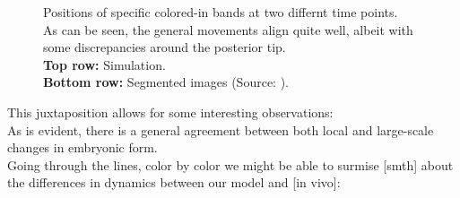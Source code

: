 \begin{figure}[H]
    \centering
\end{figure}
\begin{figure}[H]
    \centering
    \caption{Positions of specific colored-in bands at two differnt time points.\\ 
    As can be seen, the general movements align quite well, albeit with some discrepancies around the posterior tip.
    \\ \textbf{Top row:} Simulation.\\ \textbf{Bottom row:}  Segmented images (Source: ). \\}
    \label{fig:band-movements-stas}
\end{figure}

This juxtaposition allows for some interesting observations:\\
As is evident, there is a general agreement between both local and large-scale changes in embryonic form. \\

Going through the lines, color by color we might be able to surmise [smth] about the differences in dynamics between our model and [in vivo]:

